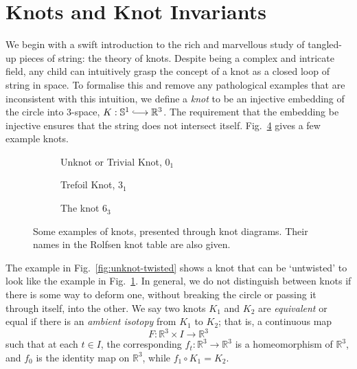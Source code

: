 \documentclass[12pt]{report}
\newcommand{\R}{\mathbb{R}}
\renewcommand{\S}{\mathbb{S}}
\newcommand{\inject}{\lhook\joinrel\longrightarrow}
\theoremstyle{upright}
\begin{document}
\section{Knots and Knot Invariants}

We begin with a swift introduction to the rich and marvellous study of tangled-up pieces of string: the theory of knots. Despite being a complex and intricate field, any child can intuitively grasp the concept of a knot as a closed loop of string in space. To formalise this and remove any pathological examples that are inconsistent with this intuition, we define a \textit{knot} to be an injective embedding of the circle into $3$-space, $K: \S^{1} \inject \R^{3}$. The requirement that the embedding be injective ensures that the string does not intersect itself. Fig.~\ref{fig:knot-examples} gives a few example knots.

\begin{figure}[hbt!]
	\centering
	\hspace*{\fill}
	\begin{subfigure}[b]{0.3 \textwidth}
		\centering
		\def\svgscale{0.2}
		
		\caption{Unknot or Trivial Knot, $0_{1}$}
		\label{fig:unknot}
	\end{subfigure}
	\hspace*{\fill}
	\begin{subfigure}[b]{0.3 \textwidth}
		\centering
		\def\svgscale{0.2}
		
		\caption{Trefoil Knot, $3_{1}$}
		\label{fig:trefoil}
	\end{subfigure}
	\hspace*{\fill}
	\begin{subfigure}[b]{0.3 \textwidth}
		\centering
		\def\svgscale{0.2}
		
		\caption{The knot $6_{3}$}
		\label{fig:6-3-knot}
	\end{subfigure}
	\caption{Some examples of knots, presented through knot diagrams. Their names in the Rolfsen knot table are also given.}
	\label{fig:knot-examples}
	\hspace*{\fill} 
\end{figure}

The example in Fig.~\ref{fig:unknot-twisted} shows a knot that can be `untwisted' to look like the example in Fig.~\ref{fig:unknot}. In general, we do not distinguish between knots if there is some way to deform one, without breaking the circle or passing it through itself, into the other. We say two knots $K_{1}$ and $K_{2}$ are \textit{equivalent} or equal if there is an \textit{ambient isotopy} from $K_{1}$ to $K_{2}$; that is, a continuous map
\[F: \R^{3} \times I \longrightarrow \R^{3}\]
such that at each $t \in I$, the corresponding $f_{t}: \R^{3} \longrightarrow \R^{3}$ is a homeomorphism of $\R^{3}$, and $f_{0}$ is the identity map on $\R^{3}$, while $f_{1} \circ K_{1} = K_{2}$.
\end{document}
